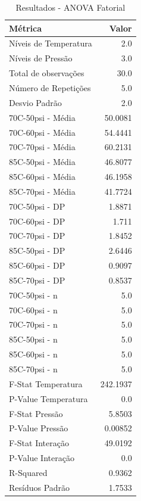 \begin{table}[H]
\centering
\caption{Resultados - ANOVA Fatorial}
\label{tab:resultados_fatorial}
\begin{tabular}{|l|r|}
\hline
\textbf{Métrica} & \textbf{Valor} \\
\hline
Níveis de Temperatura & 2.0 \\
Níveis de Pressão & 3.0 \\
Total de observações & 30.0 \\
Número de Repetições & 5.0 \\
Desvio Padrão & 2.0 \\
70C-50psi - Média & 50.0081 \\
70C-60psi - Média & 54.4441 \\
70C-70psi - Média & 60.2131 \\
85C-50psi - Média & 46.8077 \\
85C-60psi - Média & 46.1958 \\
85C-70psi - Média & 41.7724 \\
70C-50psi - DP & 1.8871 \\
70C-60psi - DP & 1.711 \\
70C-70psi - DP & 1.8452 \\
85C-50psi - DP & 2.6446 \\
85C-60psi - DP & 0.9097 \\
85C-70psi - DP & 0.8537 \\
70C-50psi - n & 5.0 \\
70C-60psi - n & 5.0 \\
70C-70psi - n & 5.0 \\
85C-50psi - n & 5.0 \\
85C-60psi - n & 5.0 \\
85C-70psi - n & 5.0 \\
F-Stat Temperatura & 242.1937 \\
P-Value Temperatura & 0.0 \\
F-Stat Pressão & 5.8503 \\
P-Value Pressão & 0.00852 \\
F-Stat Interação & 49.0192 \\
P-Value Interação & 0.0 \\
R-Squared & 0.9362 \\
Resíduos Padrão & 1.7533 \\
\hline
\end{tabular}
\end{table}
